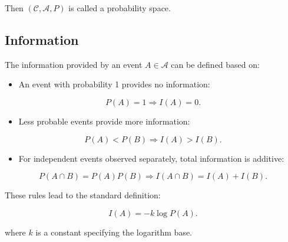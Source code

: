 \documentclass[12pt]{article}
\begin{document}
Then $(\mathcal{C}, \mathcal{A}, P)$ is called a probability space.

\subsection*{Information}

The information provided by an event $A \in \mathcal{A}$ can be defined based on:

\begin{itemize}
  \item An event with probability 1 provides no information:
\end{itemize}
\begin{equation}
P(A) = 1 \Rightarrow I(A) = 0.
\end{equation}

\begin{itemize}
  \item Less probable events provide more information:
\end{itemize}
\begin{equation}
P(A) < P(B) \Rightarrow I(A) > I(B).
\end{equation}

\begin{itemize}
  \item For independent events observed separately, total information is additive:
\end{itemize}
\begin{equation}
P(A \cap B) = P(A) P(B) \Rightarrow I(A \cap B) = I(A) + I(B).
\end{equation}

These rules lead to the standard definition:

\begin{equation}
I(A) = -k \log P(A).
\end{equation}

where $k$ is a constant specifying the logarithm base.
\newpage


\end{document}
